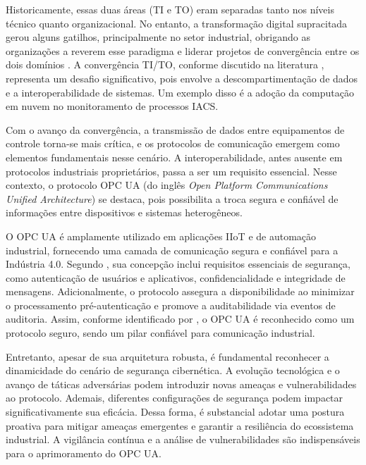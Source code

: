     Historicamente, essas duas áreas (TI e TO) eram separadas tanto nos níveis técnico quanto organizacional. No entanto, a transformação digital supracitada gerou alguns gatilhos, principalmente no setor industrial, obrigando as organizações a reverem esse paradigma e liderar projetos de convergência entre os dois domínios \cite{yassine2021}. A convergência TI/TO, conforme discutido na literatura \cite{yassine2021,tian2019,garimella2018}, representa um desafio significativo, pois envolve a descompartimentação de dados e a interoperabilidade de sistemas. Um exemplo disso é a adoção da computação em nuvem no monitoramento de processos IACS.

    Com o avanço da convergência, a transmissão de dados entre equipamentos de controle torna-se mais crítica, e os protocolos de comunicação emergem como elementos fundamentais nesse cenário. A interoperabilidade, antes ausente em protocolos industriais proprietários, passa a ser um requisito essencial. Nesse contexto, o protocolo OPC UA (do inglês \textit{Open Platform Communications Unified Architecture}) se destaca, pois possibilita a troca segura e confiável de informações entre dispositivos e sistemas heterogêneos.

    O OPC UA é amplamente utilizado em aplicações IIoT e de automação industrial, fornecendo uma camada de comunicação segura e confiável para a Indústria 4.0. Segundo , sua concepção inclui requisitos essenciais de segurança, como autenticação de usuários e aplicativos, confidencialidade e integridade de mensagens. Adicionalmente, o protocolo assegura a disponibilidade ao minimizar o processamento pré-autenticação e promove a auditabilidade via eventos de auditoria. Assim, conforme identificado por , o OPC UA é reconhecido como um protocolo seguro, sendo um pilar confiável para comunicação industrial.

    Entretanto, apesar de sua arquitetura robusta, é fundamental reconhecer a dinamicidade do cenário de segurança cibernética. A evolução tecnológica e o avanço de táticas adversárias podem introduzir novas ameaças e vulnerabilidades ao protocolo. Ademais, diferentes configurações de segurança podem impactar significativamente sua eficácia. Dessa forma, é substancial adotar uma postura proativa para mitigar ameaças emergentes e garantir a resiliência do ecossistema industrial. A vigilância contínua e a análise de vulnerabilidades são indispensáveis para o aprimoramento do OPC UA.

